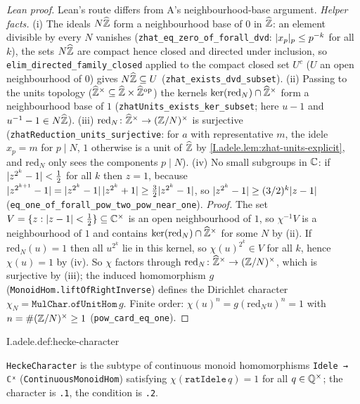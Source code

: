 \begin{proof}[Lean proof]
Lean's route differs from A's neighbourhood-base argument. \emph{Helper facts.} (i) The ideals $N\widehat{\mathbb{Z}}$ form a neighbourhood base of $0$ in $\widehat{\mathbb{Z}}$: an element divisible by every $N$ vanishes (\texttt{zhat\_eq\_zero\_of\_forall\_dvd}: $\lvert x_p\rvert_p\le p^{-k}$ for all $k$), the sets $N\widehat{\mathbb{Z}}$ are compact hence closed and directed under inclusion, so \texttt{elim\_directed\_family\_closed} applied to the compact closed set $U^{c}$ ($U$ an open neighbourhood of $0$) gives $N\widehat{\mathbb{Z}}\subseteq U$ (\texttt{zhat\_exists\_dvd\_subset}). (ii) Passing to the units topology ($\widehat{\mathbb{Z}}^\times\subseteq\widehat{\mathbb{Z}}\times\widehat{\mathbb{Z}}^{\mathrm{op}}$) the kernels $\ker(\mathrm{red}_N)\cap\widehat{\mathbb{Z}}^\times$ form a neighbourhood base of $1$ (\texttt{zhatUnits\_exists\_ker\_subset}; here $u-1$ and $u^{-1}-1\in N\widehat{\mathbb{Z}}$). (iii) $\mathrm{red}_N\colon\widehat{\mathbb{Z}}^\times\to(\mathbb{Z}/N)^\times$ is surjective (\texttt{zhatReduction\_units\_surjective}: for $a$ with representative $m$, the idele $x_p=m$ for $p\mid N$, $1$ otherwise is a unit of $\widehat{\mathbb{Z}}$ by \cref{I.adele.lem:zhat-units-explicit}, and $\mathrm{red}_N$ only sees the components $p\mid N$). (iv) No small subgroups in $\mathbb{C}$: if $\lvert z^{2^k}-1\rvert<\tfrac12$ for all $k$ then $z=1$, because $\lvert z^{2^{k+1}}-1\rvert=\lvert z^{2^k}-1\rvert\,\lvert z^{2^k}+1\rvert\ge\tfrac32\lvert z^{2^k}-1\rvert$, so $\lvert z^{2^k}-1\rvert\ge(3/2)^k\lvert z-1\rvert$ \,(\texttt{eq\_one\_of\_forall\_pow\_two\_pow\_near\_one}). \emph{Proof.} The set $V=\{z:\lvert z-1\rvert<\tfrac12\}\subseteq\mathbb{C}^\times$ is an open neighbourhood of $1$, so $\chi^{-1}V$ is a neighbourhood of $1$ and contains $\ker(\mathrm{red}_N)\cap\widehat{\mathbb{Z}}^\times$ for some $N$ by (ii). If $\mathrm{red}_N(u)=1$ then all $u^{2^k}$ lie in this kernel, so $\chi(u)^{2^k}\in V$ for all $k$, hence $\chi(u)=1$ by (iv). So $\chi$ factors through $\mathrm{red}_N\colon\widehat{\mathbb{Z}}^\times\to(\mathbb{Z}/N)^\times$, which is surjective by (iii); the induced homomorphism $g$ (\texttt{MonoidHom.liftOfRightInverse}) defines the Dirichlet character $\chi_N=\texttt{MulChar.ofUnitHom}\,g$. Finite order: $\chi(u)^n=g(\mathrm{red}_N u)^{n}=1$ with $n=\#(\mathbb{Z}/N)^\times\ge1$ (\texttt{pow\_card\_eq\_one}).
\end{proof}

\begin{definition}
\end{definition}
\begin{tfformal}{I.adele.def:hecke-character}
\begin{tffidelity}
\texttt{HeckeCharacter} is the subtype of continuous monoid homomorphisms \texttt{Idele → ℂˣ} (\texttt{ContinuousMonoidHom}) satisfying $\chi(\texttt{ratIdele}\,q)=1$ for all $q\in\mathbb{Q}^\times$; the character is \texttt{.1}, the condition is \texttt{.2}.
\end{tffidelity}
\end{tfformal}


